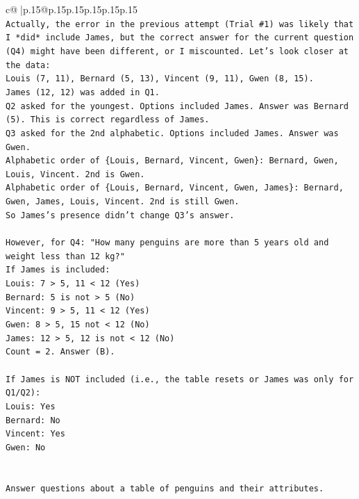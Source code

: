 \documentclass{article}
\begin{document}
{\begin{supertabular}{c@{$\;$}|p{.15\linewidth}@{}p{.15\linewidth}p{.15\linewidth}p{.15\linewidth}p{.15\linewidth}p{.15\linewidth}}
{{{\\ 
\texttt{Actually, the error in the previous attempt (Trial \#1) was likely that I *did* include James, but the correct answer for the current question (Q4) might have been different, or I miscounted. Let's look closer at the data:} \\
\texttt{Louis (7, 11), Bernard (5, 13), Vincent (9, 11), Gwen (8, 15).} \\
\texttt{James (12, 12) was added in Q1.} \\
\texttt{Q2 asked for the youngest. Options included James. Answer was Bernard (5). This is correct regardless of James.} \\
\texttt{Q3 asked for the 2nd alphabetic. Options included James. Answer was Gwen.} \\
\texttt{Alphabetic order of \{Louis, Bernard, Vincent, Gwen\}: Bernard, Gwen, Louis, Vincent. 2nd is Gwen.} \\
\texttt{Alphabetic order of \{Louis, Bernard, Vincent, Gwen, James\}: Bernard, Gwen, James, Louis, Vincent. 2nd is still Gwen.} \\
\texttt{So James's presence didn't change Q3's answer.} \\
\\ 
\texttt{However, for Q4: "How many penguins are more than 5 years old and weight less than 12 kg?"} \\
\texttt{If James is included:} \\
\texttt{Louis: 7 > 5, 11 < 12 (Yes)} \\
\texttt{Bernard: 5 is not > 5 (No)} \\
\texttt{Vincent: 9 > 5, 11 < 12 (Yes)} \\
\texttt{Gwen: 8 > 5, 15 not < 12 (No)} \\
\texttt{James: 12 > 5, 12 is not < 12 (No)} \\
\texttt{Count = 2. Answer (B).} \\
\\ 
\texttt{If James is NOT included (i.e., the table resets or James was only for Q1/Q2):} \\
\texttt{Louis: Yes} \\
\texttt{Bernard: No} \\
\texttt{Vincent: Yes} \\
\texttt{Gwen: No} \\
\\ 
\\ 
\texttt{Answer questions about a table of penguins and their attributes.} \\
}}}
\end{supertabular}}
\end{document}
